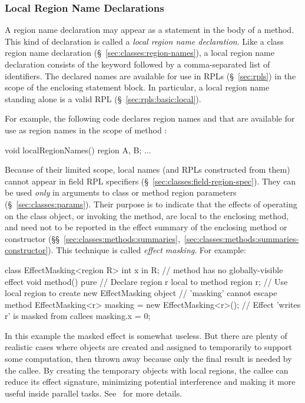 \subsubsection{Local Region Name Declarations%
\label{sec:classes:methods:local-regions}}

A region name declaration may appear as a statement in the body of a
method.  This kind of declaration is called a \emph{local region name
  declaration}.  Like a class region name declaration
(\S~\ref{sec:classes:region-names}), a local region name declaration
consists of the keyword  followed by a comma-separated
list of identifiers.  The declared names are available for use in RPLs
(\S~\ref{sec:rpls}) in the scope of the enclosing statement block.  In
particular, a local region name standing alone is a valid RPL
(\S~\ref{sec:rpls:basic:local}).

For example, the following code declares
region names  and  that are available for use as region
names in the scope of method :
%
\begin{dpjlisting}
void localRegionNames() {
  region A, B;
  ...
}
\end{dpjlisting}
%

Because of their limited scope, local names (and RPLs constructed from
them) cannot appear in field RPL specifiers
(\S~\ref{sec:classes:field-region-spec}).  They can be used
\emph{only} in arguments to class or method region parameters
(\S~\ref{sec:classes:params}).  Their purpose is to indicate that the
effects of operating on the class object, or invoking the method, are
local to the enclosing method, and need not to be reported in the
effect summary of the enclosing method or constructor
(\S\S~\ref{sec:classes:methods:summaries},~\ref{sec:classes:methods:summaries-constructor}).
This technique is called \emph{effect masking}.  For example:
%
\begin{dpjlisting}
class EffectMasking<region R> {
  int x in R;
  // method has no globally-visible effect
  void method() 
    pure 
  {
    // Declare region r local to method
    region r;
    // Use local region to create new EffectMasking object
    // 'masking' cannot escape method
    EffectMasking<r> masking = new EffectMasking<r>();
    // Effect 'writes r' is masked from callees
    masking.x = 0;
  }
}
\end{dpjlisting}
%
In this example the masked effect is somewhat useless.  But there are
plenty of realistic cases where objects are created and assigned to
temporarily to support some computation, then thrown away because only
the final result is needed by the callee.  By creating the temporary
objects with local regions, the callee can reduce its effect
signature, minimizing potential interference and making it more useful
inside parallel tasks.  See \tutorial\ for more details.

